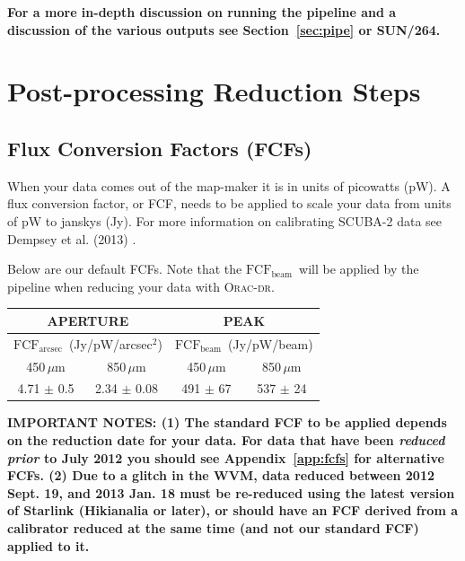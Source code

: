 \documentclass[twoside,11pt]{article}
\newcommand{\htmladdnormallink}[2]{#1}
\newcommand{\htmlref}[2]{#1}
\newcommand{\latex}[1]{#1}
\newcommand{\latexhtml}[2]{#1}
\newcommand{\xref}[3]{#1}
\newcommand{\xlabel}[1]{}
\renewcommand{\_}{\texttt{\symbol{95}}}
\newcommand{\fcfb}{$\mathrm{FCF_{beam}}$}
\newcommand{\fcfa}{$\mathrm{FCF_{arcsec}}$}
\newcommand{\oracdr}{\htmladdnormallink{\textsc{Orac-dr}}{http://www.oracdr.org/oracdr}}
\newcommand{\pipelinesun}{\xref{\textbf{SUN/264}}{sun264}{}}
\newcommand{\cref}[3]{\latexhtml{#1~\ref{#2}}{\htmlref{#3}{#2}}}
\begin{document}
\textbf{For a more in-depth discussion on running the pipeline and a discussion
of the various outputs see \cref{Section}{sec:pipe}{The SCUBA-2
Pipeline} or \pipelinesun.}
\clearpage


\section{\xlabel{postprocess}Post-processing Reduction Steps}
\label{sec:postprocess}

\subsection{\xlabel{apply_fcf}Flux Conversion Factors (FCFs)}
\label{sec:cmult}

When your data comes out of the map-maker it is in units of picowatts
(pW). A flux conversion factor, or FCF, needs to be applied to scale
your data from units of pW to janskys (Jy). For more information on calibrating
SCUBA-2 data see Dempsey et al. (2013) \cite{dempsey12}.
\newline

Below are our default FCFs. Note that the \fcfb\ will be applied
by the pipeline when reducing your data with \oracdr.

\latex{\vspace{0.5cm}}
\latex{\renewcommand*\arraystretch{1.2}}
\begin{table}[h!]
\centering
\begin{tabular}{|c|c|c|c|}
\hline
\multicolumn{2}{|c|}{\textbf{APERTURE}}  &
\multicolumn{2}{c|}{\textbf{PEAK}}      \\
\hline
\multicolumn{2}{|c|}{\fcfa\ (Jy/pW/arcsec$^2$) }  &
\multicolumn{2}{c|}{\fcfb\ (Jy/pW/beam)}      \\
\hline
\hspace{0.4cm} 450\,$\mu$m \hspace{0.3cm} & 850\,$\mu$m & \hspace{0.4cm} 450\,$\mu$m \hspace{0.3cm}& 850\,$\mu$m \\
\hline
4.71 $\pm$ 0.5& 2.34 $\pm$ 0.08& 491 $\pm$ 67& 537 $\pm$ 24 \\
\hline
\end{tabular}
\end{table}
\latex{\renewcommand*\arraystretch{1.0}}
\latex{\vspace{0.5cm}}

\textbf{IMPORTANT NOTES:
  \newline
  (1) The standard FCF to be applied depends on
  the reduction date for your data. For data that have been
  \emph{reduced prior} to July 2012 you should see
  \cref{Appendix}{app:fcfs}{FCFs by Reduction Date} for alternative FCFs.
  \newline
  (2) Due to a glitch in the WVM, data reduced between 2012 Sept. 19,
  and 2013 Jan. 18 must be re-reduced using the latest version of
  Starlink (Hikianalia or later), or should have an FCF derived from a
  calibrator reduced at the same time (and not our standard FCF) applied
  to it.
}
\end{document}
